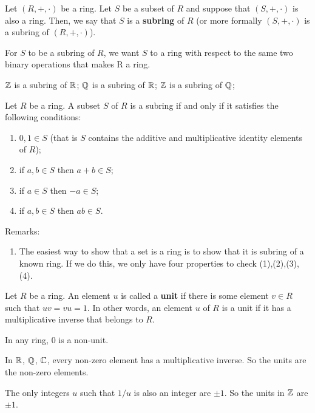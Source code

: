 \documentclass[12pt]{book}
\begin{document}
\begin{defi}\label{def:ring2}
      Let $(R,+, \cdot)$ be a ring. Let $S$ be a subset of $R$ and suppose that $(S,+, \cdot)$ is also a ring. Then, we say that $S$ is a \textbf{subring} of $R$ 
	  (or more formally $(S,+, \cdot)$ is a subring of $(R,+, \cdot)$).
\end{defi}
For $S$ to be a subring of $R$, we want $S$ to a ring with respect to the same two binary operations that makes R a ring.

\begin{examp}\label{exp:ring2}
            $\mathbb{Z}$ is a subring of $\mathbb{R}$; $\mathbb{Q}$ is a subring of $\mathbb{R}$; $\mathbb{Z}$ is a subring of $\mathbb{Q}$;
\end{examp}

\begin{defi}\label{def:ring3}
      Let $R$ be a ring. A subset $S$ of $R$ is a subring if and only if it satisfies the following conditions:
      \begin{enumerate}
	         \item $0, 1 \in S$ (that is $S$ contains the additive and multiplicative identity elements of $R$);
			 \item if $a, b \in S$ then $a + b \in S$;
			 \item if $a \in S$ then $-a \in S$;
			 \item if $a, b \in S$ then $ab \in S$. 
	  \end{enumerate}
\end{defi}

Remarks:
\begin{enumerate}
      \item The easiest way to show that a set is a ring is to show that it is subring of a known ring. If we do this, 
      we only have four properties to check (1),(2),(3),(4).
\end{enumerate}
\begin{defi}\label{def:rrr}
      Let $R$ be a ring. An element $u$ is called a \textbf{unit} if there is some element $v \in R$ such that $uv = vu = 1$. In other words, 
	  an element $u$ of $R$ is a unit if it has a multiplicative inverse that belongs to $R$.
\end{defi}

\begin{examp}\label{exp:ring3}
      In any ring, $0$ is a non-unit.     
\end{examp}
\begin{examp}\label{exp:ring4}
      In $\mathbb{R}$, $\mathbb{Q}$, $\mathbb{C}$, every non-zero element has a multiplicative inverse. So the units are the non-zero elements.     
\end{examp}
\begin{examp}\label{exp:ring5}
      The only integers $u$ such that $1/u$ is also an integer are $\pm 1$. So the units in $\mathbb{Z}$ are $\pm 1$.    
\end{examp}
\end{document}
